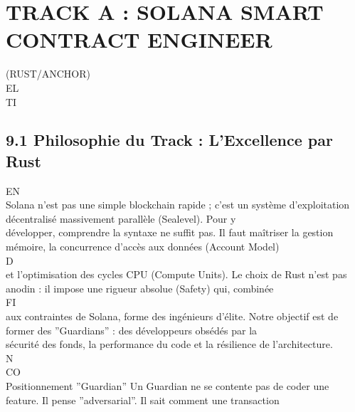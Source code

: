 \documentclass[12pt,landscape,a4paper]{article}
\begin{document}
\section{TRACK A : SOLANA SMART CONTRACT ENGINEER}
(RUST/ANCHOR)\\
\vspace{0.5em}
\vspace{0.5em}
\vspace{0.5em}
\vspace{0.5em}
EL\\
TI\\
\subsection{9.1 Philosophie du Track : L’Excellence par Rust}
\vspace{0.5em}
\vspace{0.5em}
\vspace{0.5em}
\vspace{0.5em}
EN\\
Solana n’est pas une simple blockchain rapide ; c’est un système d’exploitation décentralisé massivement parallèle (Sealevel). Pour y\\
développer, comprendre la syntaxe ne suffit pas. Il faut maîtriser la gestion mémoire, la concurrence d’accès aux données (Account Model)\\
\vspace{0.5em}
\vspace{0.5em}
\vspace{0.5em}
\vspace{0.5em}
D\\
et l’optimisation des cycles CPU (Compute Units). Le choix de Rust n’est pas anodin : il impose une rigueur absolue (Safety) qui, combinée\\
\vspace{0.5em}
\vspace{0.5em}
\vspace{0.5em}
\vspace{0.5em}
FI\\
aux contraintes de Solana, forme des ingénieurs d’élite. Notre objectif est de former des ”Guardians” : des développeurs obsédés par la\\
sécurité des fonds, la performance du code et la résilience de l’architecture.\\
N\\
CO\\
Positionnement ”Guardian” Un Guardian ne se contente pas de coder une feature. Il pense ”adversarial”. Il sait comment une transaction\\
\end{document}
